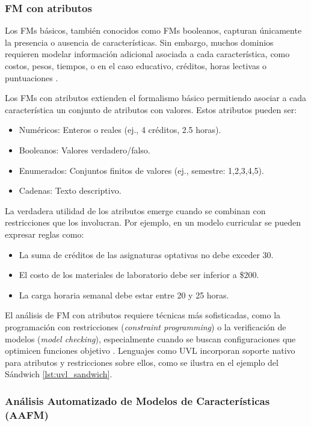 \subsubsection{\ac{FM} con atributos}

Los \ac{FM}s básicos, también conocidos como \ac{FM}s booleanos, capturan únicamente 
la presencia o ausencia de características. Sin embargo, muchos dominios requieren 
modelar información adicional asociada a cada característica, como costos, pesos, 
tiempos, o en el caso educativo, créditos, horas lectivas o puntuaciones 
\citep{benavides2005Taxonomy}.

Los \ac{FM}s con atributos 
extienden el formalismo básico permitiendo asociar a cada característica un 
conjunto de atributos con valores. Estos atributos pueden ser:
\begin{itemize}
    \item Numéricos: Enteros o reales (ej., 4 créditos, 2.5 horas).
    \item Booleanos: Valores verdadero/falso.
    \item Enumerados: Conjuntos finitos de valores (ej., semestre: 1,2,3,4,5).
    \item Cadenas: Texto descriptivo.
\end{itemize}

La verdadera utilidad de los atributos emerge cuando se combinan con restricciones que los involucran. Por ejemplo, en un modelo curricular se pueden expresar reglas como:

\begin{itemize}
    \item La suma de créditos de las asignaturas optativas no debe exceder 30.
    \item El costo de los materiales de laboratorio debe ser inferior a \$200.
    \item La carga horaria semanal debe estar entre 20 y 25 horas.
\end{itemize}

El análisis de \ac{FM} con atributos requiere técnicas más sofisticadas, 
como la programación con restricciones (\textit{constraint programming}) o la 
verificación de modelos (\textit{model checking}), especialmente cuando se buscan 
configuraciones que optimicen funciones objetivo \citep{benavides2010automated}. 
Lenguajes como \ac{UVL} incorporan soporte nativo para atributos y restricciones 
sobre ellos, como se ilustra en el ejemplo del Sándwich \ref{lst:uvl_sandwich}.

\subsubsection{Análisis Automatizado de Modelos de Características (AAFM)}

